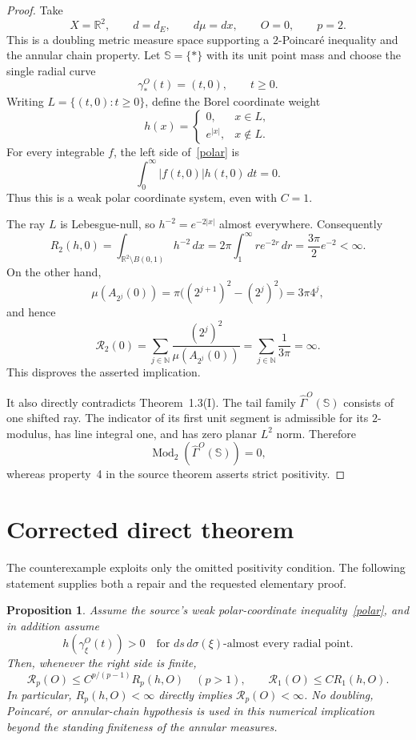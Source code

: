 \documentclass[11pt]{article}
\newtheorem{proposition}{Proposition}
\newcommand{\R}{\mathbb R}
\newcommand{\Sph}{\mathbb S}
\begin{document}
\begin{proof}
Take
\[
 X=\R^2,\qquad d=d_E,\qquad d\mu=dx,
 \qquad O=0,\qquad p=2.
\]
This is a doubling metric measure space supporting a $2$-Poincar\'e
inequality and the annular chain property.  Let $\Sph=\{\ast\}$ with its
unit point mass and choose the single radial curve
\[
 \gamma_\ast^O(t)=(t,0),\qquad t\ge0.
\]
Writing $L=\{(t,0):t\ge0\}$, define the Borel coordinate weight
\[
 h(x)=\begin{cases}
  0,&x\in L,\\
  e^{|x|},&x\notin L.
 \end{cases}
\]
For every integrable $f$, the left side of~\eqref{polar} is
\[
 \int_0^\infty |f(t,0)|h(t,0)\,dt=0.
\]
Thus this is a weak polar coordinate system, even with $C=1$.

The ray $L$ is Lebesgue-null, so $h^{-2}=e^{-2|x|}$ almost everywhere.
Consequently
\[
 R_2(h,0)=\int_{\R^2\setminus B(0,1)}h^{-2}\,dx
 =2\pi\int_1^\infty r e^{-2r}\,dr
 =\frac{3\pi}{2}e^{-2}<\infty.
\]
On the other hand,
\[
 \mu(A_{2^j}(0))
 =\pi\bigl((2^{j+1})^2-(2^j)^2\bigr)
 =3\pi4^j,
\]
and hence
\[
 \mathcal R_2(0)
 =\sum_{j\in\mathbb N}\frac{(2^j)^2}{\mu(A_{2^j}(0))}
 =\sum_{j\in\mathbb N}\frac1{3\pi}=\infty.
\]
This disproves the asserted implication.

It also directly contradicts Theorem~1.3(I).  The tail family
$\widehat\Gamma^O(\Sph)$ consists of one shifted ray.  The indicator of its
first unit segment is admissible for its $2$-modulus, has line integral one,
and has zero planar $L^2$ norm.  Therefore
\[
 \operatorname{Mod}_2(\widehat\Gamma^O(\Sph))=0,
\]
whereas property~4 in the source theorem asserts strict positivity.
\end{proof}

\section{Corrected direct theorem}
The counterexample exploits only the omitted positivity condition.  The
following statement supplies both a repair and the requested elementary
proof.

\begin{proposition}\label{repair}
Assume the source's weak polar-coordinate inequality~\eqref{polar}, and in
addition assume
\[
 h(\gamma^O_\xi(t))>0
 \quad\text{for }ds\,d\sigma(\xi)\text{-almost every radial point.}
\]
Then, whenever the right side is finite,
\[
 \mathcal R_p(O)\le C^{p/(p-1)}R_p(h,O)\quad(p>1),
 \qquad
 \mathcal R_1(O)\le C R_1(h,O).
\]
In particular, $R_p(h,O)<\infty$ directly implies
$\mathcal R_p(O)<\infty$.  No doubling, Poincar\'e, or annular-chain
hypothesis is used in this numerical implication beyond the standing
finiteness of the annular measures.
\end{proposition}
\end{document}
